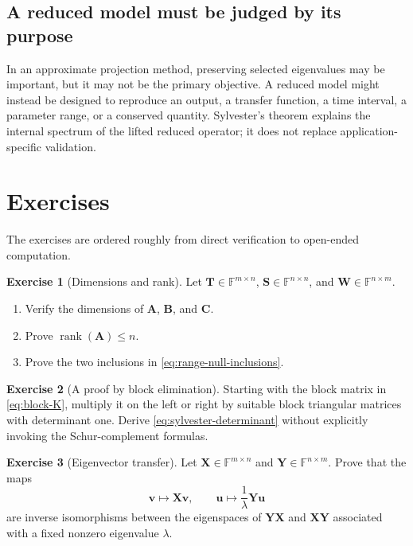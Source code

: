 \documentclass[11pt]{article}
\newcommand{\F}{\mathbb{F}}
\newcommand{\mat}[1]{\mathbf{#1}}
\newcommand{\vect}[1]{\mathbf{#1}}
\newcommand{\rank}{\operatorname{rank}}
\theoremstyle{definition}
\newtheorem{exercise}{Exercise}[section]
\theoremstyle{remark}
\begin{document}
\subsection{A reduced model must be judged by its purpose}

In an approximate projection method, preserving selected eigenvalues may be important, but it may not be the primary objective. A reduced model might instead be designed to reproduce an output, a transfer function, a time interval, a parameter range, or a conserved quantity. Sylvester's theorem explains the internal spectrum of the lifted reduced operator; it does not replace application-specific validation.

\section{Exercises}
\label{sec:exercises}

The exercises are ordered roughly from direct verification to open-ended computation.

\begin{exercise}[Dimensions and rank]
\label{ex:dimensions-rank}
Let \(\mat{T}\in\F^{m\times n}\), \(\mat{S}\in\F^{n\times n}\), and \(\mat{W}\in\F^{n\times m}\).
\begin{enumerate}[label=(\alph*)]
  \item Verify the dimensions of \(\mat{A}\), \(\mat{B}\), and \(\mat{C}\).
  \item Prove \(\rank(\mat{A})\leq n\).
  \item Prove the two inclusions in \cref{eq:range-null-inclusions}.
\end{enumerate}
\end{exercise}

\begin{exercise}[A proof by block elimination]
\label{ex:block-proof}
Starting with the block matrix in \cref{eq:block-K}, multiply it on the left or right by suitable block triangular matrices with determinant one. Derive \cref{eq:sylvester-determinant} without explicitly invoking the Schur-complement formulas.
\end{exercise}

\begin{exercise}[Eigenvector transfer]
\label{ex:eigenvector-transfer}
Let \(\mat{X}\in\F^{m\times n}\) and \(\mat{Y}\in\F^{n\times m}\). Prove that the maps
\[
  \vect{v}\mapsto\mat{X}\vect{v},
  \qquad
  \vect{u}\mapsto\frac{1}{\lambda}\mat{Y}\vect{u}
\]
are inverse isomorphisms between the eigenspaces of \(\mat{Y}\mat{X}\) and \(\mat{X}\mat{Y}\) associated with a fixed nonzero eigenvalue \(\lambda\).
\end{exercise}
\end{document}
